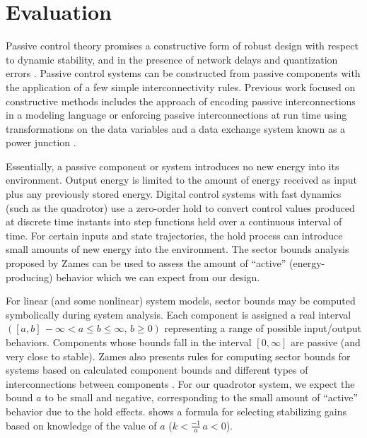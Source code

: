 \section{Evaluation}

Passive control theory promises a constructive form of robust design with
respect to dynamic stability, and in the presence of network delays and
quantization errors \cite{pass:fettweis86} \cite{ncs:chopra}
\cite{pass:conditions}.  Passive control systems can be constructed from
passive components with the application of a few simple interconnectivity
rules.  Previous work focused on constructive methods includes the approach of
encoding passive interconnections in a modeling language \cite{ncs:mic} or
enforcing passive interconnections at run time using transformations on the data
variables and a data exchange system known as a power junction
\cite{pass:powerjunction}.  

Essentially, a passive component or system introduces no new energy into its
environment.  Output energy is limited to the amount of energy received as
input plus any previously stored energy.  Digital control systems with fast
dynamics (such as the quadrotor) use a zero-order hold to convert control values
produced at discrete time instants into step functions held over a continuous
interval of time.  For certain inputs and state trajectories, the hold process
can introduce small amounts of new energy into the environment.  The sector
bounds analysis proposed by Zames \cite{control:sectors1} can be used to assess
the amount of ``active'' (energy-producing) behavior which we can expect from
our design.

For linear (and some nonlinear) system models, sector bounds may be computed
symbolically during system analysis.  Each component is assigned a real
interval $([a,b] \, -\infty < a \leq b \leq \infty, \, b \geq 0 )$
representing a range of possible input/output behaviors.  Components whose
bounds fall in the interval $[0, \infty]$ are passive (and very close to
stable). Zames also presents rules for computing sector bounds for systems
based on calculated component bounds and different types of interconnections
between components \cite{control:sectors1}.  For our quadrotor system, we
expect the bound $a$ to be small and negative, corresponding to the small
amount of ``active'' behavior due to the hold effects. \cite{quad:passcontrol}
shows a formula for selecting stabilizing gains based on knowledge of the value
of $a$ ($ k < \frac{-1}{a} \, a < 0$).

